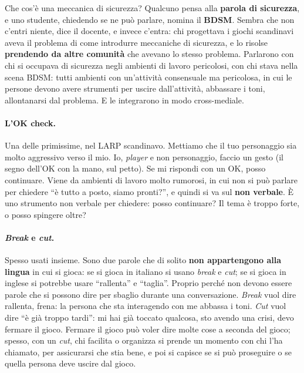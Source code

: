 Che cos'è una meccanica di sicurezza? Qualcuno pensa alla \textbf{parola di
sicurezza}, e uno studente, chiedendo se ne può parlare, nomina il \textbf{BDSM}.
Sembra che non c'entri niente, dice il docente, e invece c'entra: chi progettava i
giochi scandinavi aveva il problema di come introdurre meccaniche di sicurezza, e lo
risolse \textbf{prendendo da altre comunità} che avevano lo stesso problema. Parlarono
con chi si occupava di sicurezza negli ambienti di lavoro pericolosi, con chi stava
nella scena BDSM: tutti ambienti con un'attività consensuale ma pericolosa, in cui le
persone devono avere strumenti per uscire dall'attività, abbassare i toni,
allontanarsi dal problema. E le integrarono in modo cross-mediale.

\paragraph{L'OK check.} Una delle primissime, nel LARP scandinavo. Mettiamo che il tuo
personaggio sia molto aggressivo verso il mio. Io, \emph{player} e non personaggio,
faccio un gesto (il segno dell'OK con la mano, sul petto). Se mi rispondi con un OK,
posso continuare. Viene da ambienti di lavoro molto rumorosi, in cui non si può parlare
per chiedere ``è tutto a posto, siamo pronti?'', e quindi si va sul \textbf{non
verbale}. È uno strumento non verbale per chiedere: posso continuare? Il tema è troppo
forte, o posso spingere oltre?

\paragraph{\emph{Break} e \emph{cut}.} Spesso usati insieme. Sono due parole che di
solito \textbf{non appartengono alla lingua} in cui si gioca: se si gioca in italiano
si usano \emph{break} e \emph{cut}; se si gioca in inglese si potrebbe usare
``rallenta'' e ``taglia''. Proprio perché non devono essere parole che si possono dire
per sbaglio durante una conversazione. \emph{Break} vuol dire rallenta, frena: la
persona che sta interagendo con me abbassa i toni. \emph{Cut} vuol dire ``è già troppo
tardi'': mi hai già toccato qualcosa, sto avendo una crisi, devo fermare il gioco.
Fermare il gioco può voler dire molte cose a seconda del gioco; spesso, con un
\emph{cut}, chi facilita o organizza si prende un momento con chi l'ha chiamato, per
assicurarsi che stia bene, e poi si capisce se si può proseguire o se quella persona
deve uscire dal gioco.


